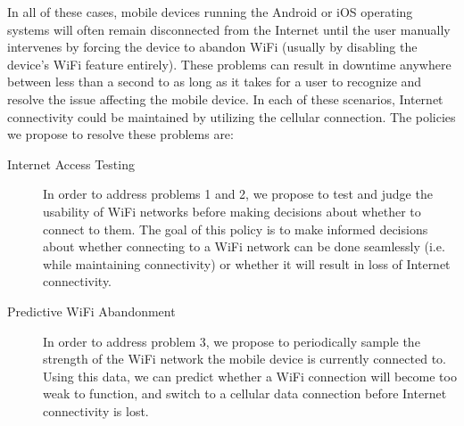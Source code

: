 In all of these cases, mobile devices running the Android or iOS operating systems will often remain disconnected from the Internet until the user manually intervenes by forcing the device to abandon WiFi (usually by disabling the device's WiFi feature entirely). These problems can result in downtime anywhere between less than a second to as long as it takes for a user to recognize and resolve the issue affecting the mobile device. In each of these scenarios, Internet connectivity could be maintained by utilizing the cellular connection. The policies we propose to resolve these problems are:

\begin{description}
\item[Internet Access Testing] In order to address problems 1 and 2, we propose to test and judge the usability of WiFi networks before making decisions about whether to connect to them. The goal of this policy is to make informed decisions about whether connecting to a WiFi network can be done seamlessly (i.e. while maintaining connectivity) or whether it will result in loss of Internet connectivity.
\item[Predictive WiFi Abandonment] In order to address problem 3, we propose to periodically sample the strength of the WiFi network the mobile device is currently connected to. Using this data, we can predict whether a WiFi connection will become too weak to function, and switch to a cellular data connection before Internet connectivity is lost.
\end{description}

